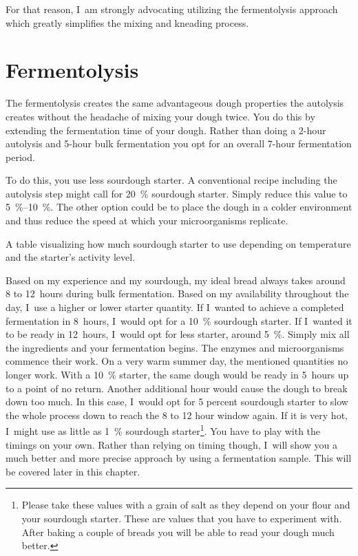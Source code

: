 For that reason, I~am strongly advocating utilizing the fermentolysis approach
which greatly simplifies the mixing and kneading process.

\section{Fermentolysis}%
\label{section:fermentolysis}

The fermentolysis creates the same advantageous dough properties the
autolysis creates without the headache of mixing your dough twice. You do this
by extending the fermentation time of your dough. Rather than doing a 2-hour
autolysis and 5-hour bulk fermentation you opt for an overall 7-hour
fermentation period.

To do this, you use less sourdough starter. A conventional recipe including the
autolysis step might call for \qty{20}{\percent} sourdough starter. Simply reduce this
value to \qtyrange{5}{10}{\percent}. The other option could be to place the dough in a colder
environment and thus reduce the speed at which your microorganisms replicate.

\begin{table}[!htb]
    \begin{center}
        
        \caption[Quantity of sourdough]{A table visualizing how much sourdough
            starter to use depending on temperature and the starter's activity
            level.}
    \end{center}
\end{table}

Based on my experience and my sourdough, my ideal bread always takes around 8
to 12~hours during bulk fermentation. Based on my availability throughout
the day, I~use a higher or lower starter quantity. If I~wanted to achieve a completed
fermentation in 8~hours, I~would opt for a \qty{10}{\percent} sourdough starter. If
I~wanted it to be ready in 12~hours, I~would opt for less starter, around \qty{5}{\percent}.
Simply mix all the ingredients and your fermentation begins. The
enzymes and microorganisms commence their work. On a very warm summer day, the
mentioned quantities no longer work. With a \qty{10}{\percent} starter, the same dough
would be ready in 5~hours up to a point of no return. Another additional hour
would cause the dough to break down too much. In this case, I~would opt for 5
percent sourdough starter to slow the whole process down to reach the 8 to 12
hour window again. If it is very hot, I~might use as little as \qty{1}{\percent}
sourdough starter\footnote{Please take these values with a grain of salt as
they depend on your flour and your sourdough starter. These are values that
you have to experiment with. After baking a couple of breads you will be able
to read your dough much better.}. You have to play with the timings on your own.
Rather than relying on timing though, I~will show you a much better and more precise approach
by using a fermentation sample. This will be covered later in this chapter.

